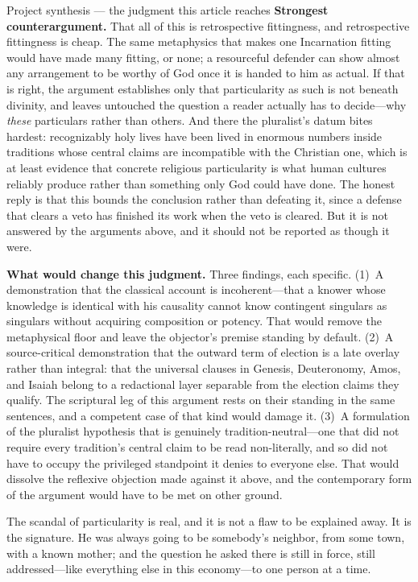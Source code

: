 \begin{studybox}{Project synthesis --- the judgment this article reaches}
\textbf{Strongest counterargument.} That all of this is retrospective fittingness, and retrospective fittingness is cheap. The same metaphysics that makes one Incarnation fitting would have made many fitting, or none; a resourceful defender can show almost any arrangement to be worthy of God once it is handed to him as actual. If that is right, the argument establishes only that particularity as such is not beneath divinity, and leaves untouched the question a reader actually has to decide---why \emph{these} particulars rather than others. And there the pluralist's datum bites hardest: recognizably holy lives have been lived in enormous numbers inside traditions whose central claims are incompatible with the Christian one, which is at least evidence that concrete religious particularity is what human cultures reliably produce rather than something only God could have done. The honest reply is that this bounds the conclusion rather than defeating it, since a defense that clears a veto has finished its work when the veto is cleared. But it is not answered by the arguments above, and it should not be reported as though it were.

\textbf{What would change this judgment.} Three findings, each specific. (1)~A demonstration that the classical account is incoherent---that a knower whose knowledge is identical with his causality cannot know contingent singulars as singulars without acquiring composition or potency. That would remove the metaphysical floor and leave the objector's premise standing by default. (2)~A source-critical demonstration that the outward term of election is a late overlay rather than integral: that the universal clauses in Genesis, Deuteronomy, Amos, and Isaiah belong to a redactional layer separable from the election claims they qualify. The scriptural leg of this argument rests on their standing in the same sentences, and a competent case of that kind would damage it. (3)~A formulation of the pluralist hypothesis that is genuinely tradition-neutral---one that did not require every tradition's central claim to be read non-literally, and so did not have to occupy the privileged standpoint it denies to everyone else. That would dissolve the reflexive objection made against it above, and the contemporary form of the argument would have to be met on other ground.
\end{studybox}

The scandal of particularity is real, and it is not a flaw to be explained away. It is the signature. He was always going to be somebody's neighbor, from some town, with a known mother; and the question he asked there is still in force, still addressed---like everything else in this economy---to one person at a time.
